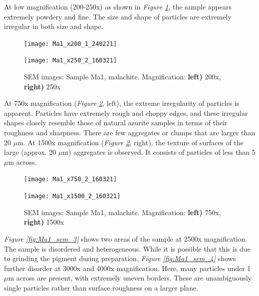 At low magnification (200-250x) as shown in \textit{Figure \ref{fig:Ma1_sem_1}}, the sample appears extremely powdery and fine. The size and shape of particles are extremely irregular in both size and shape. 

\begin{figure}[H]
\centering
\begin{minipage}{.45\textwidth}
  \centering
  \texttt{[image: Ma1\_x200\_1\_240221]}
\end{minipage}
\begin{minipage}{.45\textwidth}
  \centering
  \texttt{[image: Ma1\_x250\_2\_160321]}
\end{minipage}
\caption[SEM images: Sample Ma1, malachite]{SEM images: Sample Ma1, malachite. Magnification: \textbf{left)} 200x, \textbf{right)} 250x}
\label{fig:Ma1_sem_1}
\end{figure}

At 750x magnification (\textit{Figure \ref{fig:Ma1_sem_2}}, left), the extreme irregularity of particles is apparent. Particles have extremely rough and choppy edges, and these irregular shapes closely resemble those of natural azurite samples in terms of their roughness and sharpness. There are few aggregates or clumps that are larger than 20 $\mu$m. At 1500x magnification (\textit{Figure \ref{fig:Ma1_sem_2}}, right), the texture of surfaces of the large (approx. 20 $\mu$m) aggregates is observed. It consists of particles of less than 5 $\mu$m across. 
\begin{figure}[H]
\centering
\begin{minipage}{.45\textwidth}
  \centering
  \texttt{[image: Ma1\_x750\_2\_160321]}
\end{minipage}
\begin{minipage}{.45\textwidth}
  \centering
  \texttt{[image: Ma1\_x1500\_2\_160321]}
\end{minipage}
\caption[SEM images: Sample Ma1, malachite]{SEM images: Sample Ma1, malachite. Magnification: \textbf{left)} 750x, \textbf{right)} 1500x}
\label{fig:Ma1_sem_2}
\end{figure}

\textit{Figure \ref{fig:Ma1_sem_3}} shows two areas of the sample at 2500x magnification. The sample is disordered and heterogeneous. While it is possible that this is due to grinding the pigment during preparation, \textit{Figure \ref{fig:Ma1_sem_4}} shows further disorder at 3000x and 4000x magnification. Here, many particles under 1 $\mu$m across are present, with extremely uneven borders. These are unambiguously single particles rather than surface roughness on a larger plane.


